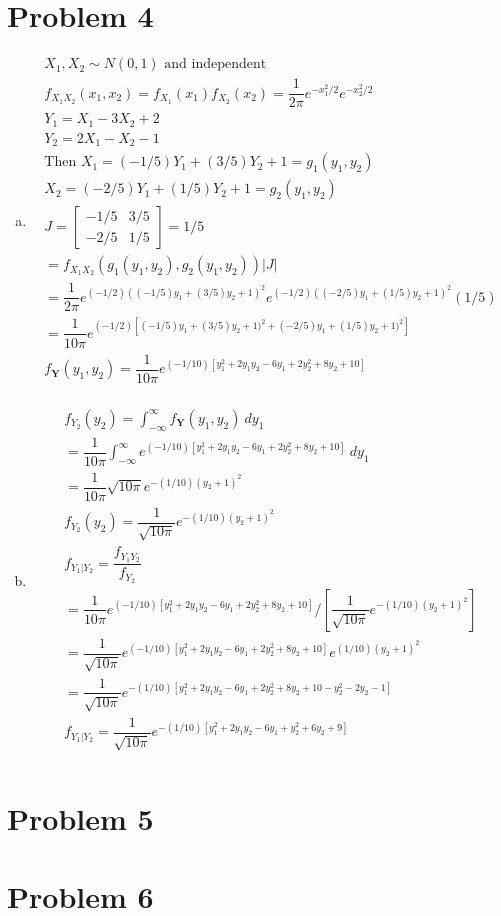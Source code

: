 \documentclass{article}
\begin{document}
\begin{flushleft}
\section*{Problem 4}
\begin{enumerate}[(a)]
\item
\begin{multline*}
X_1, X_2 \sim N(0,1) \text{ and independent}\\
f_{X_1X_2}(x_1,x_2)=f_{X_1}(x_1)f_{X_2}(x_2)=\dfrac{1}{2\pi}e^{-x_1^2/2}e^{-x_2^2/2}\\
Y_1=X_1-3X_2+2\\
Y_2=2X_1-X_2-1\\
\text{Then } X_1=(-1/5)Y_1+(3/5)Y_2+1=g_1(y_1,y_2)\\
X_2=(-2/5)Y_1+(1/5)Y_2+1=g_2(y_1,y_2)\\
J=\begin{bmatrix}
-1/5 & 3/5\\
-2/5 & 1/5
\end{bmatrix}=1/5\\
=f_{X_1X_2}(g_1(y_1,y_2),g_2(y_1,y_2))|J|\\
=\dfrac{1}{2\pi}e^{(-1/2)((-1/5)y_1+(3/5)y_2+1)^2}e^{(-1/2)((-2/5)y_1+(1/5)y_2+1)^2}(1/5)\\
=\dfrac{1}{10\pi}e^{(-1/2)\left[(-1/5)y_1+(3/5)y_2+1)^2+(-2/5)y_1+(1/5)y_2+1)^2\right]}\\
f_{\boldsymbol{Y}}(y_1,y_2)=\dfrac{1}{10\pi}e^{(-1/10)[y_1^2+2y_1y_2-6y_1+2y_2^2+8y_2+10]}\\
\end{multline*}
\item
\begin{multline*}
f_{Y_2}(y_2)=\int_{-\infty}^{\infty}f_{\boldsymbol{Y}}(y_1,y_2) \ dy_1\\
=\dfrac{1}{10\pi}\int_{-\infty}^{\infty}e^{(-1/10)[y_1^2+2y_1y_2-6y_1+2y_2^2+8y_2+10]} \ dy_1\\
=\dfrac{1}{10\pi}\sqrt{10\pi}e^{-(1/10)(y_2+1)^2}\\
f_{Y_2}(y_2)=\dfrac{1}{\sqrt{10\pi}}e^{-(1/10)(y_2+1)^2}\\
f_{Y_1|Y_2}=\dfrac{f_{Y_1Y_2}}{f_{Y_2}}\\
=\dfrac{1}{10\pi}e^{(-1/10)[y_1^2+2y_1y_2-6y_1+2y_2^2+8y_2+10]}/\left[\dfrac{1}{\sqrt{10\pi}}e^{-(1/10)(y_2+1)^2}\right]\\
=\dfrac{1}{\sqrt{10\pi}}e^{(-1/10)[y_1^2+2y_1y_2-6y_1+2y_2^2+8y_2+10]}e^{(1/10)(y_2+1)^2}\\
=\dfrac{1}{\sqrt{10\pi}}e^{-(1/10)[y_1^2+2y_1y_2-6y_1+2y_2^2+8y_2+10-y_2^2-2y_2-1]}\\
f_{Y_1|Y_2}=\dfrac{1}{\sqrt{10\pi}}e^{-(1/10)[y_1^2+2y_1y_2-6y_1+y_2^2+6y_2+9]}\\
\end{multline*}
\end{enumerate}
\section*{Problem 5}

\section*{Problem 6}
\end{flushleft}
\end{document}
